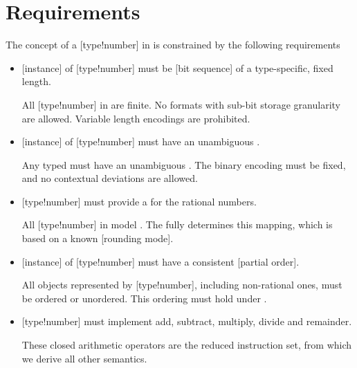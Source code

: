 \section{Requirements}

The concept of a [type!number] in \basetwo is constrained by the following requirements

\begin{itemize}
    \item[\Require{req:bits}] [instance] of [type!number] must be [bit sequence] of a type-specific, fixed length.

    \begin{highlight}{}
        All [type!number] in \basetwo are finite.
        No formats with sub-bit storage granularity are allowed.
        Variable length encodings are prohibited.
    \end{highlight}

    \item[\Require{req:interpretation}] [instance] of [type!number] must have an unambiguous .

    \begin{highlight}{}
        Any typed  must have an unambiguous .
        The binary encoding must be fixed, and no contextual deviations are allowed.
    \end{highlight}

    \item[\Require{req:representation}] [type!number] must provide a  for the rational numbers.

    \begin{highlight}{}
        All [type!number] in \basetwo model \Rat{}.
        The  fully determines this mapping, which is based on a known [rounding mode].
    \end{highlight}

    \item[\Require{req:ordering}] [instance] of [type!number] must have a consistent [partial order].

    \begin{highlight}{}
        All objects represented by [type!number], including non-rational ones, must be ordered or unordered.
        This ordering must hold under .
    \end{highlight}

    \item[\Require{req:closed_arithmetic}] [type!number] must implement add, subtract, multiply, divide and remainder.

    \begin{highlight}{}
        These closed arithmetic operators are the reduced instruction set, from which we derive all other semantics.
    \end{highlight}
\end{itemize}

